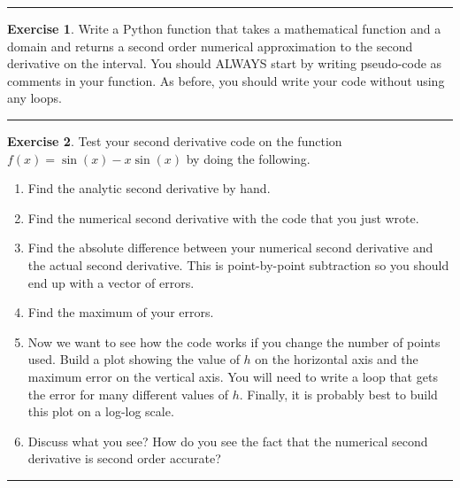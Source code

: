 \documentclass[
]{book}
\theoremstyle{definition}
\theoremstyle{definition}
\theoremstyle{definition}
\newtheorem{exercise}{Exercise}[chapter]
\theoremstyle{remark}
\begin{document}
\begin{center}\rule{0.5\linewidth}{0.5pt}\end{center}

\begin{exercise}
\protect\hypertarget{exr:unnamed-chunk-168}{}{\label{exr:unnamed-chunk-168} }Write a Python function that takes a mathematical function and a domain and returns a second
order numerical approximation to the second derivative on the interval.
You should ALWAYS start by writing pseudo-code as comments in your function. As before, you should write your code without using any loops.
\end{exercise}

\begin{center}\rule{0.5\linewidth}{0.5pt}\end{center}

\begin{exercise}
\protect\hypertarget{exr:unnamed-chunk-169}{}{\label{exr:unnamed-chunk-169} }Test your second derivative code on the function
\(f(x) = \sin(x) - x\sin(x)\) by doing the following.

\begin{enumerate}
\def\labelenumi{\alph{enumi}.}
\item
  Find the analytic second derivative by hand.
\item
  Find the numerical second derivative with the code that you just
  wrote.
\item
  Find the absolute difference between your numerical second
  derivative and the actual second derivative. This is point-by-point
  subtraction so you should end up with a vector of errors.
\item
  Find the maximum of your errors.
\item
  Now we want to see how the code works if you change the number of
  points used. Build a plot showing the value of \(h\) on the horizontal
  axis and the maximum error on the vertical axis. You will need to
  write a loop that gets the error for many different values of \(h\).
  Finally, it is probably best to build this plot on a log-log scale.
\item
  Discuss what you see? How do you see the fact that the numerical
  second derivative is second order accurate?
\end{enumerate}
\end{exercise}

\begin{center}\rule{0.5\linewidth}{0.5pt}\end{center}
\end{document}
